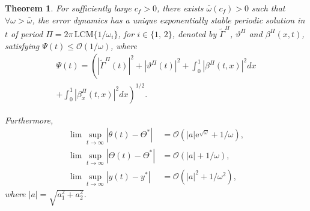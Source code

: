 \documentclass[letterpaper, 10 pt, conference]{ieeeconf}  %
\newtheorem{theorem}{Theorem}%
\begin{document}
\medskip

\begin{theorem}
    For sufficiently large $c_f>0$, there exists $\bar{\omega}(c_f)>0$ such that $\forall \omega >\bar{\omega}$, the error dynamics has a unique exponentially stable periodic solution in $t$ of period $\Pi=2\pi\, \mbox{LCM}\{1/\omega_{i}\}$, for $i \in \{1,\,2\}$, denoted by $\tilde{\Gamma}^\Pi$, $\vartheta^\Pi$ and $\beta^\Pi(x,t)$, satisfying $\Psi(t) \leq \mathcal{O}(1/\omega)$, where
\begin{multline}
    \Psi(t) = \left(|\tilde{\Gamma}^\Pi(t)|^{2} + |\vartheta^\Pi(t)|^{2} + \int_{0}^{1}|\beta^\Pi(t,x)|^{2}dx\right.\\
    \left.+\int_{0}^{1}|\beta^\Pi_{x}(t,x)|^{2}dx\right)^{1/2}.\label{eq:psi-norm}
\end{multline}

Furthermore,
\begin{align}
    \lim\sup_{t\rightarrow\infty}|\theta(t)-\Theta^{*}| &= \mathcal{O}\left(|a|\mathrm{e}^{\sqrt{\omega}}+ 1/\omega\right),\label{eq:convergence_theta}\\
    \lim\sup_{t\rightarrow\infty}|\Theta(t)-\Theta^{*}| &= \mathcal{O}(|a| +1/\omega),\label{eq:convergence_Theta}\\
    \lim\sup_{t\rightarrow\infty}|y(t)-y^{*}| &= \mathcal{O}(|a|^{2}+1/\omega^{2}),\label{eq:convergence_y}
\end{align}
\noindent where $|a|=\sqrt{a_{1}^{2}+a_{2}^{2}}$.
\end{theorem}
\end{document}
